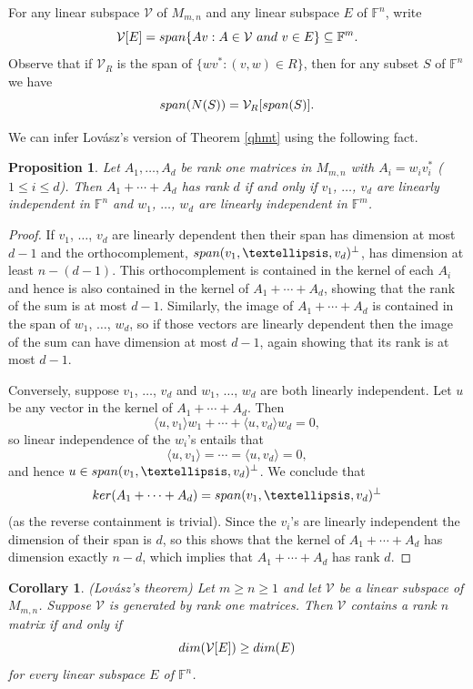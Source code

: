 \documentclass[10pt,a4paper]{amsart}
\newtheorem{cor}[thm]{Corollary}
\newtheorem{prop}[thm]{Proposition}
\begin{document}
For any linear subspace $\mathcal{V}$ of $M_{m,n}$ and any linear subspace $E$ of $\mathbb{F}^n$, write
$$\mathcal{V}[E] = {\rm span}\{Av: A \in \mathcal{V}\,\,{\rm and}\,\, v \in E\} \subseteq \mathbb{F}^m.$$ Observe that if $\mathcal{V}_R$ is the span of $\{wv^*: (v,w) \in R\}$, then for any subset $S$ of $\mathbb{F}^n$ we have $${\rm span}(N(S)) = \mathcal{V}_R[{\rm span}(S)].$$

We can infer Lovász's version of Theorem \ref{qhmt} using the following fact.

\begin{prop}\label{lafact}
Let $A_1, \ldots, A_d$ be rank one matrices in $M_{m,n}$ with $A_i = w_iv_i^*$ ($1 \leq i \leq d$). Then $A_1 + \cdots + A_d$ has rank $d$ if and only if $v_1$, $\ldots$, $v_d$ are linearly independent in $\mathbb{F}^n$ and $w_1$, $\ldots$, $w_d$ are linearly independent in $\mathbb{F}^m$.
\end{prop}

\begin{proof}
If $v_1$, $\ldots$, $v_d$ are linearly dependent then their span has dimension at most $d - 1$ and the orthocomplement, ${\rm span}(v_1, \ldots, v_d)^\perp$, has dimension at least $n - (d - 1)$. This orthocomplement is contained in the kernel of each $A_i$ and hence is also contained in the kernel of $A_1 + \cdots + A_d$, showing that the rank of the sum is at most $d - 1$. Similarly, the image of $A_1 + \cdots + A_d$ is contained in the span of $w_1$, $\ldots$, $w_d$, so if those vectors are linearly dependent then the image of the sum can have dimension at most $d-1$, again showing that its rank is at most $d - 1$.

Conversely, suppose $v_1$, $\ldots$, $v_d$ and $w_1$, $\ldots$, $w_d$ are both linearly independent. Let $u$ be any vector in the kernel of $A_1 + \cdots + A_d$. Then $$\langle u, v_1\rangle w_1 + \cdots + \langle u, v_d\rangle w_d = 0,$$ so linear independence of the $w_i$'s entails that $$\langle u, v_1\rangle = \cdots = \langle u, v_d\rangle = 0,$$ and hence $u \in {\rm span}(v_1, \ldots, v_d)^\perp$. We conclude that $${\rm ker}(A_1 + \cdots + A_d) = {\rm span}(v_1, \ldots, v_d)^\perp$$ (as the reverse containment is trivial). Since the $v_i$'s are linearly independent the dimension of their span is $d$, so this shows that the kernel of $A_1 + \cdots + A_d$ has dimension exactly $n -d$, which implies that $A_1 + \cdots + A_d$ has rank $d$.
\end{proof}

\begin{cor} \label{qhmtl} (Lovász's theorem)
Let $m \geq n \geq 1$ and let $\mathcal{V}$ be a linear subspace of $M_{m,n}$. Suppose $\mathcal{V}$ is generated by rank one matrices. Then $\mathcal{V}$ contains a rank $n$ matrix if and only if $${\rm dim}(\mathcal{V}[E]) \geq {\rm dim}(E)$$ for every linear subspace $E$ of $\mathbb{F}^n$.
\end{cor}
\end{document}
